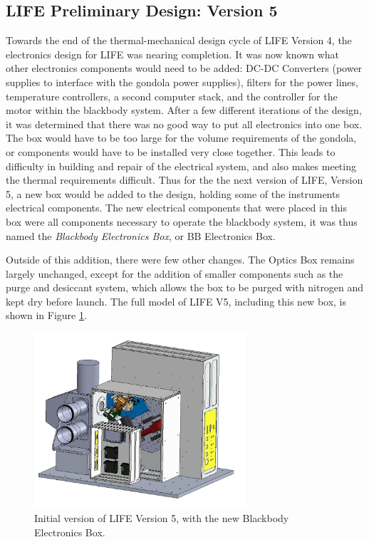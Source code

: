 \subsection{LIFE Preliminary Design: Version 5}
Towards the end of the thermal-mechanical design cycle of LIFE Version 4, the electronics design for LIFE was nearing completion. It was now known what other electronics components would need to be added: DC-DC Converters (power supplies to interface with the gondola power supplies), filters for the power lines, temperature controllers, a second computer stack, and the controller for the motor within the blackbody system. After a few different iterations of the design, it was determined that there was no good way to put all electronics into one box. The box would have to be too large for the volume requirements of the gondola, or components would have to be installed very close together. This leads to difficulty in building and repair of the electrical system, and also makes meeting the thermal requirements difficult. Thus for the the next version of LIFE, Version 5, a new box would be added to the design, holding some of the instruments electrical components. The new electrical components that were placed in this box were all components necessary to operate the blackbody system, it was thus named the \textit{Blackbody Electronics Box}, or BB Electronics Box. 

Outside of this addition, there were few other changes. The Optics Box remains largely unchanged, except for the addition of smaller components such as the purge and desiccant system, which allows the box to be purged with nitrogen and kept dry before launch. The full model of LIFE V5, including this new box, is shown in Figure \ref{fig:LIFE_V5_prelim}.

\begin{figure} %
    \centering
    \includegraphics[width=0.7\textwidth]{chap3_images/LIFE_V5_initial_images/LIFE_V5_prelim.JPG}
    \caption{Initial version of LIFE Version 5, with the new Blackbody Electronics Box.}
    \label{fig:LIFE_V5_prelim}
\end{figure}

